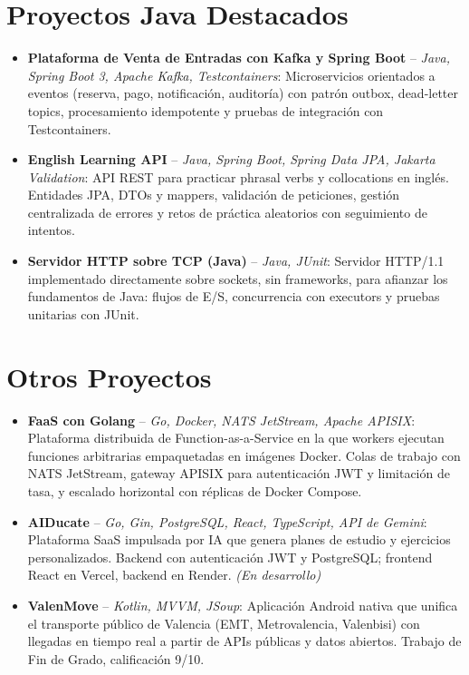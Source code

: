 \documentclass[11pt,a4paper,sans]{moderncv}
\begin{document}
\section{Proyectos Java Destacados}
\vspace{1pt}
\begin{itemize}

\item \textbf{Plataforma de Venta de Entradas con Kafka y Spring Boot} -- \textit{Java, Spring Boot 3, Apache Kafka, Testcontainers}: Microservicios orientados a eventos (reserva, pago, notificación, auditoría) con patrón outbox, dead-letter topics, procesamiento idempotente y pruebas de integración con Testcontainers.

\item \textbf{English Learning API} -- \textit{Java, Spring Boot, Spring Data JPA, Jakarta Validation}: API REST para practicar phrasal verbs y collocations en inglés. Entidades JPA, DTOs y mappers, validación de peticiones, gestión centralizada de errores y retos de práctica aleatorios con seguimiento de intentos.

\item \textbf{Servidor HTTP sobre TCP (Java)} -- \textit{Java, JUnit}: Servidor HTTP/1.1 implementado directamente sobre sockets, sin frameworks, para afianzar los fundamentos de Java: flujos de E/S, concurrencia con executors y pruebas unitarias con JUnit.

\end{itemize}


\section{Otros Proyectos}
\vspace{1pt}
\begin{itemize}

\item \textbf{FaaS con Golang} -- \textit{Go, Docker, NATS JetStream, Apache APISIX}: Plataforma distribuida de Function-as-a-Service en la que workers ejecutan funciones arbitrarias empaquetadas en imágenes Docker. Colas de trabajo con NATS JetStream, gateway APISIX para autenticación JWT y limitación de tasa, y escalado horizontal con réplicas de Docker Compose.

\item \textbf{AIDucate} -- \textit{Go, Gin, PostgreSQL, React, TypeScript, API de Gemini}: Plataforma SaaS impulsada por IA que genera planes de estudio y ejercicios personalizados. Backend con autenticación JWT y PostgreSQL; frontend React en Vercel, backend en Render. \textit{(En desarrollo)}

\item \textbf{ValenMove} -- \textit{Kotlin, MVVM, JSoup}: Aplicación Android nativa que unifica el transporte público de Valencia (EMT, Metrovalencia, Valenbisi) con llegadas en tiempo real a partir de APIs públicas y datos abiertos. Trabajo de Fin de Grado, calificación 9/10.

\end{itemize}
\end{document}
